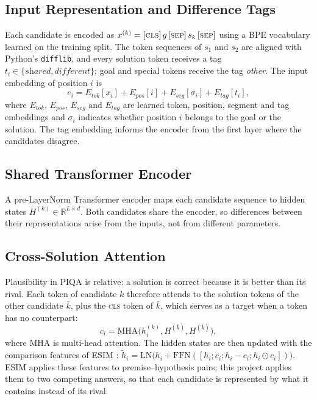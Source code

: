 \documentclass[11pt]{article}
\begin{document}
\subsection{Input Representation and Difference Tags}
Each candidate is encoded as $x^{(k)} = [\textsc{cls}]\,g\,[\textsc{sep}]\,s_k\,[\textsc{sep}]$ using a BPE vocabulary \cite{sennrich2016bpe} learned on the training split. The token sequences of $s_1$ and $s_2$ are aligned with Python's \texttt{difflib}, and every solution token receives a tag $t_i \in \{\textit{shared}, \textit{different}\}$; goal and special tokens receive the tag \textit{other}. The input embedding of position $i$ is
\begin{equation}
e_i = E_{tok}[x_i] + E_{pos}[i] + E_{seg}[\sigma_i] + E_{tag}[t_i],
\end{equation}
where $E_{tok}$, $E_{pos}$, $E_{seg}$ and $E_{tag}$ are learned token, position, segment and tag embeddings and $\sigma_i$ indicates whether position $i$ belongs to the goal or the solution. The tag embedding informs the encoder from the first layer where the candidates disagree.

\subsection{Shared Transformer Encoder}
A pre-LayerNorm Transformer encoder \cite{vaswani2017attention,xiong2020layer} maps each candidate sequence to hidden states $H^{(k)} \in \mathbb{R}^{L \times d}$. Both candidates share the encoder, so differences between their representations arise from the inputs, not from different parameters.

\subsection{Cross-Solution Attention}
Plausibility in PIQA is relative: a solution is correct because it is better than its rival. Each token of candidate $k$ therefore attends to the solution tokens of the other candidate $\bar{k}$, plus the \textsc{cls} token of $\bar{k}$, which serves as a target when a token has no counterpart:
\begin{equation}
c_i = \mathrm{MHA}\big(h^{(k)}_i, H^{(\bar{k})}, H^{(\bar{k})}\big),
\end{equation}
where MHA is multi-head attention. The hidden states are then updated with the comparison features of ESIM \cite{chen2017esim}: $\tilde{h}_i = \mathrm{LN}\big(h_i + \mathrm{FFN}([h_i; c_i; h_i - c_i; h_i \odot c_i])\big)$. ESIM applies these features to premise--hypothesis pairs; this project applies them to two competing answers, so that each candidate is represented by what it contains instead of its rival.
\end{document}
